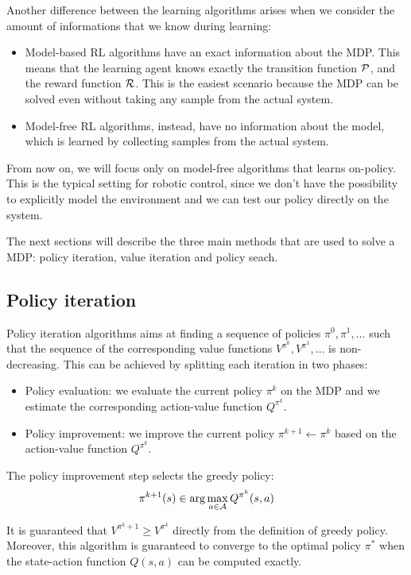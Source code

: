 Another difference between the learning algorithms arises when we consider the amount of informations that we know during learning:
\begin{itemize}
\item Model-based RL algorithms have an exact information about the MDP. This means that the learning agent knows exactly the transition function $\mathcal{P}$, and the reward function $\mathcal{R}$. This is the easiest scenario because the MDP can be solved even without taking any sample from the actual system.
\item Model-free RL algorithms, instead, have no information about the model, which is learned by collecting samples from the actual system.
\end{itemize}

From now on, we will focus only on model-free algorithms that learns on-policy. This is the typical setting for robotic control, since we don't have the possibility to explicitly model the environment and we can test our policy directly on the system.

The next sections will describe the three main methods that are used to solve a MDP: policy iteration, value iteration and policy seach.

\subsection{Policy iteration}
Policy iteration algorithms aims at finding a sequence of policies $\pi^0, \pi^1, \ldots$ such that the sequence of the corresponding value functions $V^{\pi^0}, V^{\pi^1}, \ldots$ is non-decreasing. 
This can be achieved by splitting each iteration in two phases:
\begin{itemize}
\item Policy evaluation: we evaluate the current policy $\pi^k$ on the MDP and we estimate the corresponding action-value function $Q^{\pi^k}$.
\item Policy improvement: we improve the current policy $\pi^{k+1} \gets \pi^{k}$ based on the action-value function $Q^{\pi^k}$.
\end{itemize}

The policy improvement step selects the greedy policy:
\begin{equation}
\pi^{k+1}(s) \in \arg \max_{a \in \mathcal{A}} Q^{\pi^k}(s, a)  
\end{equation}

It is guaranteed that $V^{\pi^k+1} \geq V^{\pi^k}$ directly from the definition of greedy policy. Moreover, this algorithm is guaranteed to converge to the optimal policy $\pi^*$ when the state-action function $Q(s,a)$ can be computed exactly.

